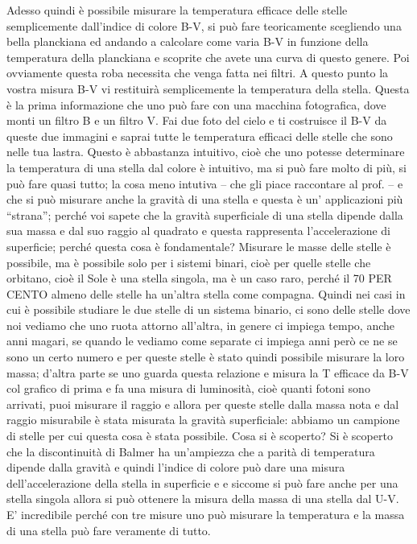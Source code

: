 \documentclass[a4paper,11pt]{article}
\begin{document}
Adesso quindi è possibile misurare la temperatura efficace delle stelle semplicemente dall’indice di colore B-V, si può fare teoricamente scegliendo una bella planckiana ed andando a calcolare come varia B-V in funzione della temperatura della planckiana e scoprite che avete una curva di questo genere. Poi ovviamente questa roba necessita che venga fatta nei filtri. A questo punto la vostra misura B-V vi restituirà semplicemente la temperatura della stella. Questa è la prima informazione che uno può fare con una macchina fotografica, dove monti un filtro B e un filtro V. Fai due foto del cielo e ti costruisce il B-V da queste due immagini e saprai tutte le temperatura efficaci delle stelle che sono nelle tua lastra. Questo è abbastanza intuitivo, cioè che uno potesse determinare la temperatura di una stella dal colore è intuitivo, ma si può fare molto di più, si può fare quasi tutto; la cosa meno intutiva – che gli piace raccontare al prof. – e che si può misurare anche la gravità di una stella e questa è un’ applicazioni più “strana”; perché voi sapete che la gravità superficiale di una stella dipende dalla sua massa e dal suo raggio al quadrato e questa rappresenta l’accelerazione di superficie; perché questa cosa è fondamentale? Misurare le masse delle stelle è possibile, ma è possibile solo per i sistemi binari, cioè per quelle stelle che orbitano, cioè il Sole è una stella singola, ma è un caso raro, perché il 70 PER CENTO almeno delle stelle ha un’altra stella come compagna. Quindi nei casi in cui è possibile studiare le due stelle di un sistema binario, ci sono delle stelle dove noi vediamo che uno ruota attorno all’altra, in genere ci impiega tempo, anche anni magari, se quando le vediamo come separate ci impiega anni però ce ne se sono un certo numero e per queste stelle è stato quindi possibile misurare la loro massa; d’altra parte se uno guarda questa relazione e misura la T efficace da B-V col grafico di prima e fa una misura di luminosità, cioè quanti fotoni sono arrivati, puoi misurare il raggio e allora per queste stelle dalla massa nota e dal raggio misurabile è stata misurata la gravità superficiale: abbiamo un campione di stelle per cui questa cosa è stata possibile. Cosa si è scoperto? Si è scoperto che la discontinuità di Balmer ha un’ampiezza che a parità di temperatura dipende dalla gravità e quindi l’indice di colore può dare una misura dell’accelerazione della stella in superficie e  e siccome si può fare anche per una stella singola allora si può ottenere la misura della massa di una stella dal U-V. E’ incredibile perché con tre misure uno può misurare la temperatura e la massa di una stella può fare veramente di tutto.
\end{document}
